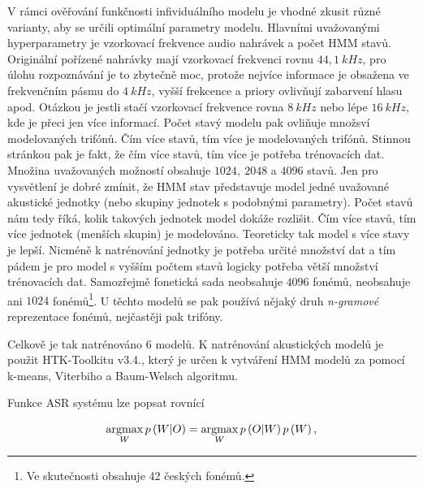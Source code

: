 V rámci ověřování funkčnosti infividuálního modelu je vhodné zkusit různé varianty, aby se určili optimální parametry modelu. Hlavními uvažovanými hyperparametry je vzorkovací frekvence audio nahrávek a počet HMM stavů. Originální pořízené nahrávky mají vzorkovací frekvenci rovnu $44,1\ kHz$, pro úlohu rozpoznávání je to zbytečně moc, protože nejvíce informace je obsažena ve frekvenčním pásmu do $4\ kHz$, vyšší frekcence a priory ovlivňují zabarvení hlasu apod. \cite{Psutka2006} Otázkou je jestli stačí vzorkovací frekvence rovna $8\ kHz$ nebo lépe $16\ kHz$, kde je přeci jen více informací. Počet stavý modelu pak ovliňuje množsví modelovaných trifónů. Čím více stavů, tím více je modelovaných trifónů. Stinnou stránkou pak je fakt, že čím více stavů, tím více  je potřeba trénovacích dat. Množina uvažovaných možností obsahuje $1024,\ 2048$ a $4096$ stavů. Jen pro vysvětlení je dobré zmínit, že HMM stav představuje model jedné uvažované akustické jednotky (nebo skupiny jednotek s podobnými parametry). Počet stavů nám tedy říká, kolik takových jednotek model dokáže rozlišit. Čím více stavů, tím více jednotek (menších skupin) je modelováno. Teoreticky tak model s více stavy je lepší. Nicméně k natrénování jednotky je potřeba určité množství dat a tím pádem je pro model s vyšším počtem stavů logicky potřeba větší množství trénovacích dat. Samozřejmě fonetická sada neobsahuje $4096$ fonémů, neobsahuje ani $1024$ fonémů\footnote{Ve skutečnosti obsahuje 42 českých fonémů.}. U těchto modelů se pak používá nějaký druh \textit{n-gramové} reprezentace fonémů, nejčastěji pak trifóny.

Celkově je tak natrénováno $6$ modelů. K natrénování akustických modelů je použit HTK-Toolkitu v3.4., který je určen k vytváření HMM modelů za pomocí k-means, Viterbiho a Baum-Welsch algoritmu.

Funkce ASR systému lze popsat rovnící

\begin{equation}
  \operatorname*{argmax}_W p\left(W | O\right) = \operatorname*{argmax}_W p\left(O | W\right) p\left(W\right),
\end{equation}

